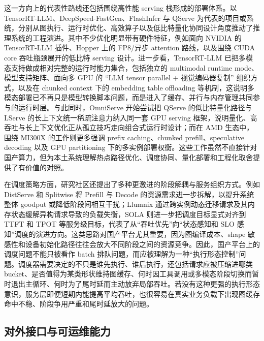 这一方向上的代表性路线还包括围绕高性能 serving 栈形成的部署体系。以 TensorRT-LLM、DeepSpeed-FastGen、FlashInfer 与 QServe 为代表的项目或系统，分别从图执行、运行时优化、高效算子以及低比特量化协同设计角度推动了推理系统的工程演进\citep{tensorrtllm,deepspeedfastgen,flashinfer,wang2024qserve}。其中不少优化明显带有硬件特征，例如面向 NVIDIA 的 TensorRT-LLM 插件、Hopper 上的 FP8/异步 attention 路线，以及围绕 CUDA core 吞吐瓶颈展开的低比特 serving 设计。进一步看，TensorRT-LLM 已把多模态支持做成相对完整的运行时能力集合，包括独立的 multimodal runtime mode、模型支持矩阵、面向多 GPU 的 ``LLM tensor parallel + 视觉编码器复制'' 组织方式，以及在 chunked context 下的 embedding table offloading 等机制，这说明多模态部署已不再只是模型转换脚本问题，而是进入了缓存、并行与内存管理共同参与的运行时层\citep{tensorrtllmmultimodal2026}。与此同时，OmniServe 开始尝试把 QServe 的低比特量化路径与 LServe 的长上下文统一稀疏注意力纳入同一套 GPU serving 框架，说明量化、高吞吐与长上下文优化正从孤立技巧走向组合式运行时设计\citep{omniserve2025}；而在 AMD 生态中，围绕 MI300X 的工作则更多强调 prefix caching、chunked prefill、speculative decoding 以及 GPU partitioning 下的多实例部署权衡\citep{zhang2024vllmamd,song2026amdgpupartition,ambati2025mi300x}。这些工作虽然不直接针对国产算力，但为本土系统理解热点路径优化、调度协同、量化部署和工程化取舍提供了有价值的对照。

在调度策略方面，研究社区还提出了多种更激进的阶段解耦与服务组织方式。例如 DistServe 和 Splitwise 将 Prefill 与 Decode 的资源需求进一步拆解，以提升系统整体 goodput 或降低阶段间相互干扰\citep{zhong2024distserve,splitwise2024}；Llumnix 通过跨实例动态迁移请求及其内存状态缓解异构请求导致的负载失衡，SOLA 则进一步把调度目标显式对齐到 TTFT 和 TPOT 等服务级目标，代表了从“吞吐优先”向“状态感知和 SLO 感知”调度的演进方向\citep{sun2024llumnix,hong2025sola}。这类思路对国产平台尤其重要，因为图编译成本、shape 敏感性和设备初始化路径往往会放大不同阶段之间的资源竞争。因此，国产平台上的调度问题不能只被看作 batch 排队问题，而应被理解为一种“执行形态控制”问题。调度器需要决定的不只是谁先执行、谁后执行，还包括请求应被压缩进哪类 bucket、是否值得为某类形状维持图缓存、何时因工具调用或多模态阶段切换而暂时退出主循环、何时为了尾时延而主动放弃局部吞吐。若没有这种更强的执行形态意识，服务层即便短期内能提高平均吞吐，也很容易在真实业务负载下出现图缓存命中不稳、阶段争用严重和尾时延放大的问题。

\subsection{对外接口与可运维能力}

